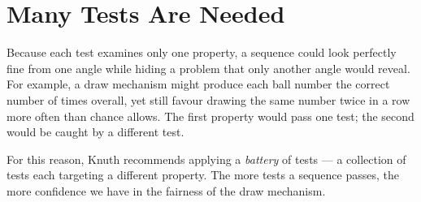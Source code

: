 \section{Many Tests Are Needed}
 
Because each test examines only one property, a sequence could look perfectly
fine from one angle while hiding a problem that only another angle would
reveal.  For example, a draw mechanism might produce each ball number the
correct number of times overall, yet still favour drawing the same number
twice in a row more often than chance allows.  The first property would pass
one test; the second would be caught by a different test.
 
For this reason, Knuth recommends applying a \emph{battery} of tests --- a
collection of tests each targeting a different property.  The more tests a
sequence passes, the more confidence we have in the fairness of the draw
mechanism.
